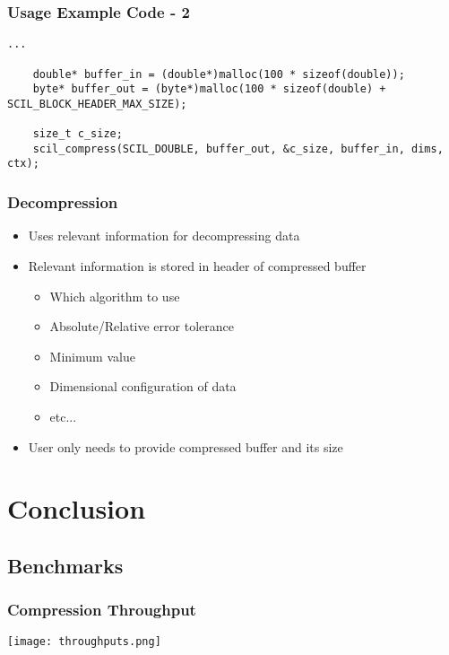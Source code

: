 \documentclass[compress]{beamer}
\begin{document}
\begin{frame}[fragile]
	\frametitle{Usage Example Code - 2}

	\begin{lstlisting}[caption=SCIL usage example - 2]
	...

	double* buffer_in = (double*)malloc(100 * sizeof(double));
	byte* buffer_out = (byte*)malloc(100 * sizeof(double) + SCIL_BLOCK_HEADER_MAX_SIZE);

	size_t c_size;
	scil_compress(SCIL_DOUBLE, buffer_out, &c_size, buffer_in, dims, ctx);
	\end{lstlisting}

\end{frame}

\begin{frame}[fragile]
	\frametitle{Decompression}

	\begin{itemize}
		\item Uses relevant information for decompressing data
		\item Relevant information is stored in header of compressed buffer
		\begin{itemize}
			\item Which algorithm to use
			\item Absolute/Relative error tolerance
			\item Minimum value
			\item Dimensional configuration of data
			\item etc...
		\end{itemize}
		\item User only needs to provide compressed buffer and its size
	\end{itemize}

\end{frame}

\section{Conclusion}
\subsection*{Benchmarks}

\begin{frame}
	\frametitle{Compression Throughput}

	\begin{center}
		\texttt{[image: throughputs.png]}
	\end{center}

\end{frame}
\end{document}
